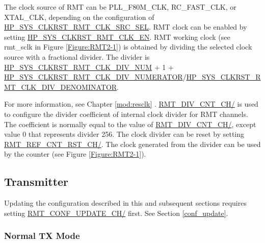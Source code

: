 \documentclass[main\_\_EN.tex]{subfiles}
\begin{document}
The clock source of RMT can be PLL\_F80M\_CLK, RC\_FAST\_CLK, or XTAL\_CLK, depending on the configuration of \hyperref[fielddesc:HPSYSCLKRSTRMTCLKSRCSEL]{HP\_SYS\_CLKRST\_RMT\_CLK\_SRC\_SEL}. RMT clock can be enabled by setting \hyperref[fielddesc:HPSYSCLKRSTRMTCLKEN]{HP\_SYS\_CLKRST\_RMT\_CLK\_EN}. RMT working clock (see rmt\_sclk in Figure \ref{Figure:RMT2-1}) is obtained by dividing the selected clock source with a fractional divider. The divider is \\\hyperref[fielddesc:HPSYSCLKRSTRMTCLKDIVNUM]{HP\_SYS\_CLKRST\_RMT\_CLK\_DIV\_NUM} + 1 +
\hyperref[fielddesc:HPSYSCLKRSTRMTCLKDIVNUMERATOR]{HP\_SYS\_CLKRST\_RMT\_CLK\_DIV\_NUMERATOR}/\hyperref[fielddesc:HPSYSCLKRSTRMTCLKDIVDENOMINATOR]{HP\_SYS\_CLKRST\_RMT\_CLK\_DIV\_DENOMINATOR}.

For more information, see Chapter \ref{mod:resclk} \textit{}. \hyperref[fielddesc:RMTDIVCNTCHN]{RMT\_DIV\_CNT\_CH/} is used to configure the divider coefficient of internal clock divider for RMT channels. The coefficient is normally equal to the value of \hyperref[fielddesc:RMTDIVCNTCHN]{RMT\_DIV\_CNT\_CH/}, except value 0 that represents divider 256. The clock divider can be reset by setting \hyperref[fielddesc:RMTREFCNTRSTCHN]{RMT\_REF\_CNT\_RST\_CH/}. The clock generated from the divider can be used by the counter (see Figure \ref{Figure:RMT2-1}).

\subsection{Transmitter}

\vspace{1em}
\begin{tiplisting}
Updating the configuration described in this and subsequent sections requires setting \hyperref[fielddesc:RMTCONFUPDATECHN]{RMT\_CONF\_UPDATE\_CH/} first. See Section \ref{conf_update}.
\end{tiplisting}
\vspace{-1em}

\subsubsection{Normal TX Mode}\label{sec:normal-tx-mode}
\end{document}
